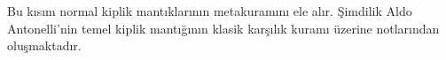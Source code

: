 


\begin{editorial}
  Bu kısım normal kiplik mantıklarının metakuramını ele alır. Şimdilik Aldo
  Antonelli'nin temel kiplik mantığının klasik karşılık kuramı üzerine
  notlarından oluşmaktadır.
\end{editorial}








\OLEndPartHook


